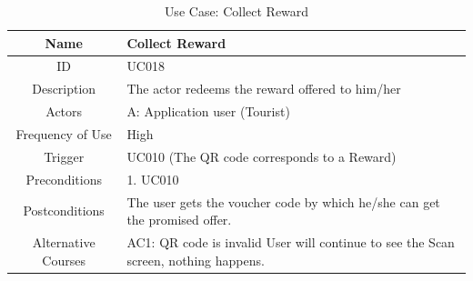 \documentclass[12pt, a4paper, oneside]{article}
\begin{document}
\begin{table}[H]
\begin{tabularx}{\linewidth}{|c|X|}
\hline
Name                & Collect Reward                                                                                                                                                                                                                     \\ \hline
ID                  & UC018                                                                                                                                                                                                                       \\ \hline
Description         & The actor redeems the reward offered to him/her                                                                                                                                                  \\ \hline
Actors              & A: Application user (Tourist)                                                                                                                                                                                                 \\ \hline
Frequency of Use    & High                                                                                                                                                                                                                    \\ \hline
Trigger             & UC010 (The QR code corresponds to a Reward)                                                                                                                                                                                           \\ \hline
Preconditions       & 1. UC010                                                                                                                                                                                                                        \\ \hline
Postconditions      & The user gets the voucher code by which he/she can get the promised offer.                                                                                                                                       \\ \hline
Alternative Courses & AC1: QR code is invalid \newline User will continue to see the Scan screen, nothing happens. \newline                                                                                           \\ \hline
\end{tabularx}
\caption{Use Case: Collect Reward}
\label{uc-collect-reward}
\end{table}
\end{document}
